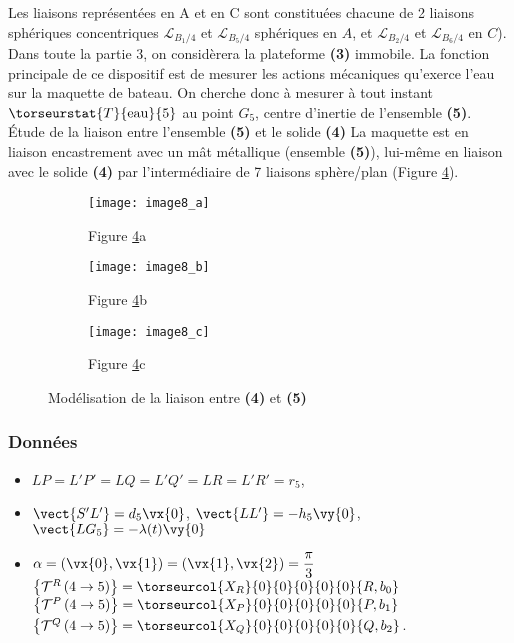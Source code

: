 Les liaisons représentées en A et en C sont constituées chacune de 2 liaisons sphériques concentriques $\mathcal{L}_{B_1/4}$ et $\mathcal{L}_{B_5/4}$ sphériques en $A$, et $\mathcal{L}_{B_2/4}$ et $\mathcal{L}_{B_6/4}$ en $C$).
Dans toute la partie 3, on considèrera la plateforme \textbf{(3)} immobile.
La fonction principale de ce dispositif est de mesurer les actions mécaniques qu’exerce l’eau sur la maquette de bateau. On cherche donc à mesurer à tout instant $\torseurstat{T}{\text{eau}}{5}$ au point $G_5$, centre d’inertie de l’ensemble \textbf{(5)}.
Étude de la liaison entre l’ensemble \textbf{(5)} et le solide \textbf{(4)}
La maquette est en liaison encastrement avec un mât métallique (ensemble \textbf{(5)}), lui-même en liaison avec le solide \textbf{(4)} par l’intermédiaire de 7 liaisons sphère/plan (Figure \ref{fig:CCMP:2021:08}).


\begin{figure}[!h]
\centering
    \begin{subfigure}[b]{.3\textwidth}
    \centering
    \texttt{[image: image8\_a]}
    \caption{Figure \ref{fig:CCMP:2021:08}a \label{fig:CCMP:2021:08:a}}
    \end{subfigure}
    \hfill
    \begin{subfigure}[b]{.3\textwidth}
    \centering
    \texttt{[image: image8\_b]}
    \caption{Figure \ref{fig:CCMP:2021:08}b \label{fig:CCMP:2021:08:b}}
    \end{subfigure}
    \hfill
    \begin{subfigure}[b]{.3\textwidth}
    \centering
    \texttt{[image: image8\_c]}
    \caption{Figure \ref{fig:CCMP:2021:08}c \label{fig:CCMP:2021:08:c}}
    \end{subfigure}
\caption{ \label{fig:CCMP:2021:08} Modélisation de la liaison entre \textbf{(4)} et \textbf{(5)}}
\end{figure}


\subsubsection*{Données}
\begin{itemize}
\item $LP=L'P' = LQ  = L'Q' = LR = L'R' = r_5$,
\item $\vect{S'L'} = d_5 \vx{0}$, $\vect{LL'} = -h_5 \vy{0}$, $\vect{LG_5}=-\lambda(t) \vy{0}$
\item $\alpha  =(\vx{0},\vx{1})=(\vx{1},\vx{2})=\dfrac{\pi}{3}$
$\left\{ \mathcal{T}^R \left(4\to 5 \right) \right\} = \torseurcol{X_R}{0}{0}{0}{0}{0}{R,b_0}$
$\left\{ \mathcal{T}^P \left(4\to 5 \right) \right\} = \torseurcol{X_P}{0}{0}{0}{0}{0}{P,b_1}$
$\left\{ \mathcal{T}^Q \left(4\to 5 \right) \right\} = \torseurcol{X_Q}{0}{0}{0}{0}{0}{Q,b_2}$.
\end{itemize}
